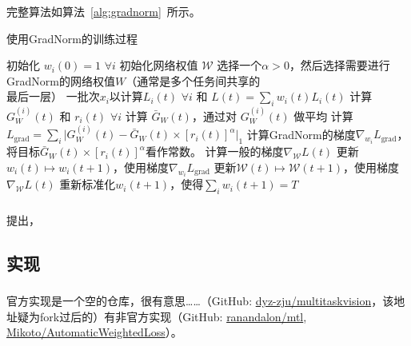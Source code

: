 \documentclass{ctexart}
\begin{document}
完整算法如算法~\ref{alg:gradnorm}~所示。

\begin{algorithm}[htb]
    \caption{使用GradNorm的训练过程}
    \label{alg:gradnorm}
 \begin{algorithmic}
    \STATE 初始化 $w_i(0)=1$ $\forall i$
    \STATE 初始化网络权值 $\mathcal{W}$
    \STATE 选择一个$\alpha> 0$，然后选择需要进行GradNorm的网络权值$W$（通常是多个任务间共享的\\ \hspace{1em} 最后一层）
    一批次$x_i$以计算$L_i(t)$ $\forall i$ 和 $L(t) = \sum_i w_i(t)L_i(t)$ {\fangsong [一般前向流程]}
    \STATE 计算 $G_W^{(i)}(t)$ 和 $r_i(t)$ $\forall i$
    \STATE 计算 $\bar{G}_W(t)$，通过对 $G_W^{(i)}(t)$ 做平均
    \STATE 计算 $L_{\text{grad}}= \sum_i\rvert G_W^{(i)}(t) - \bar{G}_W(t)\times [r_i(t)]^{\alpha}\rvert_1$
    \STATE 计算GradNorm的梯度$\nabla_{w_i} L_{\text{grad}}$，将目标$\bar{G}_W(t)\times [r_i(t)]^{\alpha}$看作常数。
    \STATE 计算一般的梯度$\nabla_{\mathcal{W}} L(t)$
    \STATE 更新$w_i(t) \mapsto w_i(t+1)$，使用梯度$\nabla_{w_i} L_{\text{grad}}$
    \STATE 更新$\mathcal{W}(t) \mapsto \mathcal{W}(t+1)$，使用梯度$\nabla_{\mathcal{W}} L(t)$ {\fangsong [一般反向流程]}
    \STATE 重新标准化$w_i(t+1)$，使得$\sum_iw_i(t+1) = T$
    \ENDFOR
 \end{algorithmic}
 \end{algorithm}

\subsubsection{}

\citet{Sener18Pareto}提出，

\subsection{实现}

\subsubsection{}

官方实现是一个空的仓库，很有意思……（GitHub: \href{https://github.com/dyz-zju/multitaskvision}{dyz-zju/multitaskvision}，该地址疑为fork过后的）有非官方实现（GitHub: \href{https://github.com/ranandalon/mtl}{ranandalon/mtl}, \href{https://github.com/Mikoto10032/AutomaticWeightedLoss}{Mikoto/Automatic\-Weighted\-Loss}）。
\end{document}
